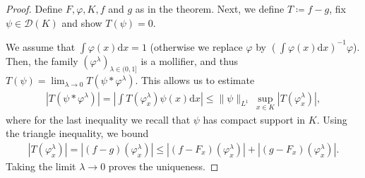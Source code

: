 \begin{proof}
    Define \(F, \varphi, K, f\) and \(g\) as in the theorem. Next, we define \(T \coloneqq f - g\), fix \(\psi \in \mathcal{D}(K)\) and show \(T(\psi) = 0\).
   
    We assume that \(\int \varphi(x) \mathrm{d} x = 1\) (otherwise we replace \(\varphi\) by \((\int \varphi(x) \mathrm{d}x)^{-1}\varphi\)). Then, the family \((\varphi^\lambda)_{\lambda \in (0,1]}\) is a mollifier, and thus \(T(\psi) = \lim_{\lambda \to 0}T(\psi * \varphi^\lambda)\). This allows us to estimate 
    \begin{align*}
        |T(\psi * \varphi^\lambda)| = \left|\int T(\varphi^\lambda_x) \psi(x) \mathrm{d}x\right| \leq \lVert \psi \rVert_{L^1} \, \sup_{x \in K}|T(\varphi^\lambda_x)|,
    \end{align*}
    where for the last inequality we recall that \(\psi\) has compact support in \(K\). Using the triangle inequality, we bound 
    \begin{align*}
        |T(\varphi^\lambda_x)| = |(f-g)(\varphi^\lambda_x)| \leq |(f-F_x)(\varphi^\lambda_x)| + |(g-F_x)(\varphi^\lambda_x)|.
    \end{align*}
    Taking the limit \(\lambda \to 0\) proves the uniqueness. 
\end{proof}
